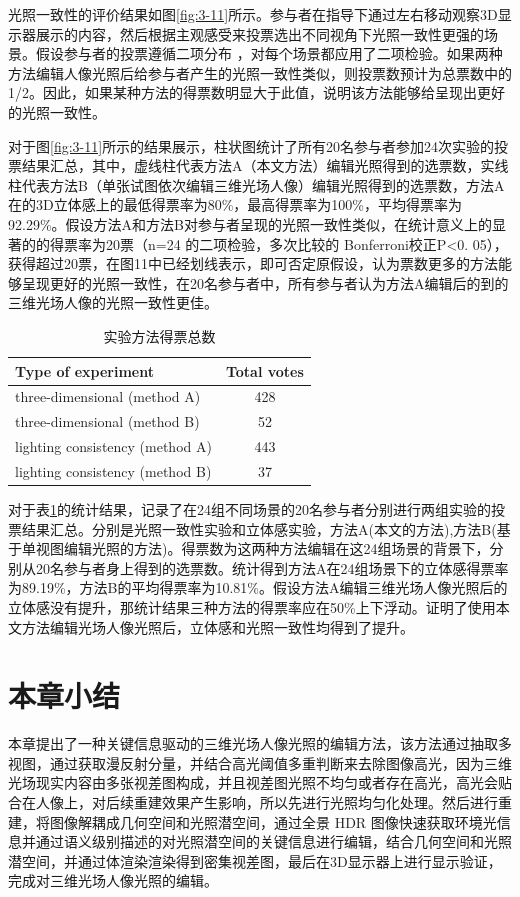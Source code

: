光照一致性的评价结果如图\ref{fig:3-11}所示。参与者在指导下通过左右移动观察3D显示器展示的内容，然后根据主观感受来投票选出不同视角下光照一致性更强的场景。假设参与者的投票遵循二项分布 ，对每个场景都应用了二项检验。如果两种方法编辑人像光照后给参与者产生的光照一致性类似，则投票数预计为总票数中的 1/2。因此，如果某种方法的得票数明显大于此值，说明该方法能够给呈现出更好的光照一致性。

对于图\ref{fig:3-11}所示的结果展示，柱状图统计了所有20名参与者参加24次实验的投票结果汇总，其中，虚线柱代表方法A（本文方法）编辑光照得到的选票数，实线柱代表方法B（单张试图依次编辑三维光场人像）编辑光照得到的选票数，方法A在的3D立体感上的最低得票率为80\%，最高得票率为100\%，平均得票率为92.29\%。假设方法A和方法B对参与者呈现的光照一致性类似，在统计意义上的显著的的得票率为20票（n=24 的二项检验，多次比较的 Bonferroni校正P<0. 05），获得超过20票，在图11中已经划线表示，即可否定原假设，认为票数更多的方法能够呈现更好的光照一致性，在20名参与者中，所有参与者认为方法A编辑后的到的三维光场人像的光照一致性更佳。
\begin{table}[htbp]
  \centering
  \caption{实验方法得票总数}
  \label{tab:3-3}
  \small
  \begin{tabular}{lc}
    \toprule
    Type of experiment & Total votes \\
    \midrule
    three-dimensional (method A) & 428 \\
    three-dimensional (method B) & 52 \\
    lighting consistency (method A) & 443 \\
    lighting consistency (method B) & 37 \\
    \bottomrule
  \end{tabular}
\end{table}

对于表\ref{tab:3-3}的统计结果，记录了在24组不同场景的20名参与者分别进行两组实验的投票结果汇总。分别是光照一致性实验和立体感实验，方法A(本文的方法),方法B(基于单视图编辑光照的方法)。得票数为这两种方法编辑在这24组场景的背景下，分别从20名参与者身上得到的选票数。统计得到方法A在24组场景下的立体感得票率为89.19\%，方法B的平均得票率为10.81\%。假设方法A编辑三维光场人像光照后的立体感没有提升，那统计结果三种方法的得票率应在50\%上下浮动。证明了使用本文方法编辑光场人像光照后，立体感和光照一致性均得到了提升。

\section{本章小结}
本章提出了一种关键信息驱动的三维光场人像光照的编辑方法，该方法通过抽取多视图，通过获取漫反射分量，并结合高光阈值多重判断来去除图像高光，因为三维光场现实内容由多张视差图构成，并且视差图光照不均匀或者存在高光，高光会贴合在人像上，对后续重建效果产生影响，所以先进行光照均匀化处理。然后进行重建，将图像解耦成几何空间和光照潜空间，通过全景 HDR 图像快速获取环境光信息并通过语义级别描述的对光照潜空间的关键信息进行编辑，结合几何空间和光照潜空间，并通过体渲染渲染得到密集视差图，最后在3D显示器上进行显示验证，完成对三维光场人像光照的编辑。

